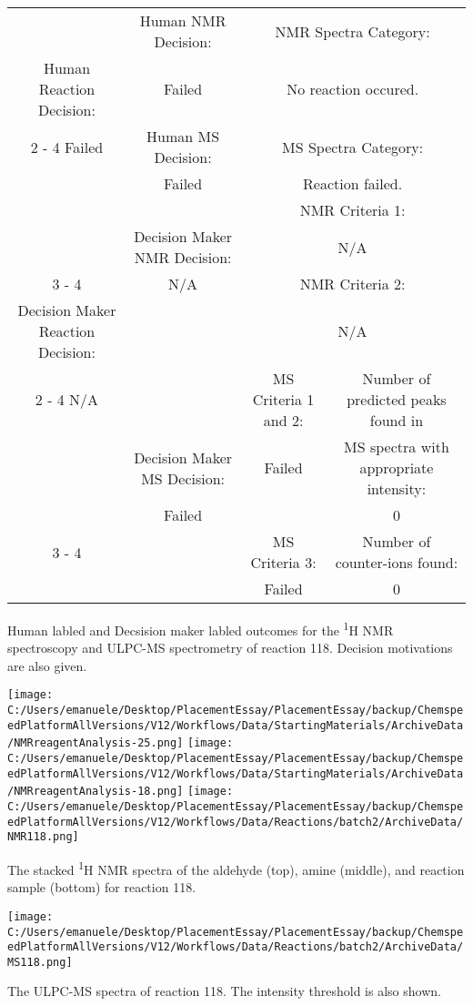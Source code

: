 \documentclass{article}%
\begin{document}
\begin{Decision Table}[H]%
\begin{tabular}{|c|c|c|c|}%
\hline%
&Human NMR Decision:&\multicolumn{2}{|c|}{NMR Spectra Category:}\\%
Human Reaction Decision:&Failed&\multicolumn{2}{|c|}{No reaction occured.}\\%
\cline{2%
-%
4}%
Failed&Human MS Decision:&\multicolumn{2}{|c|}{MS Spectra Category:}\\%
&Failed&\multicolumn{2}{|c|}{Reaction failed.}\\%
\hline%
&&\multicolumn{2}{|c|}{NMR Criteria 1:}\\%
&Decision Maker NMR Decision:&\multicolumn{2}{|c|}{N/A}\\%
\cline{3%
-%
4}%
&N/A&\multicolumn{2}{|c|}{NMR Criteria 2:}\\%
Decision Maker Reaction Decision:&&\multicolumn{2}{|c|}{N/A}\\%
\cline{2%
-%
4}%
N/A&&MS Criteria 1 and 2:&Number of predicted peaks found in\\%
&Decision Maker MS Decision:&Failed&MS spectra with appropriate intensity:\\%
&Failed&&0\\%
\cline{3%
-%
4}%
&&MS Criteria 3:&Number of counter{-}ions found:\\%
&&Failed&0\\%
\hline%
\end{tabular}%
\caption{Human labled and Decsision maker labled outcomes for the \textsuperscript{1}H NMR spectroscopy and ULPC-MS spectrometry of reaction 118. Decision motivations are also given.}%
\end{Decision Table}%
\begin{NMR Spectra}[H]%
\begin{center}%
\texttt{[image: C:/Users/emanuele/Desktop/PlacementEssay/PlacementEssay/backup/ChemspeedPlatformAllVersions/V12/Workflows/Data/StartingMaterials/ArchiveData/NMRreagentAnalysis-25.png]}\hfill%
\texttt{[image: C:/Users/emanuele/Desktop/PlacementEssay/PlacementEssay/backup/ChemspeedPlatformAllVersions/V12/Workflows/Data/StartingMaterials/ArchiveData/NMRreagentAnalysis-18.png]}\hfill%
\texttt{[image: C:/Users/emanuele/Desktop/PlacementEssay/PlacementEssay/backup/ChemspeedPlatformAllVersions/V12/Workflows/Data/Reactions/batch2/ArchiveData/NMR118.png]}\hfill%
\end{center}%
\caption{The stacked \textsuperscript{1}H NMR spectra of the aldehyde (top), amine (middle), and reaction sample (bottom) for reaction 118.}%
\end{NMR Spectra}%
\begin{MS Spectra}[H]%
\begin{center}%
\texttt{[image: C:/Users/emanuele/Desktop/PlacementEssay/PlacementEssay/backup/ChemspeedPlatformAllVersions/V12/Workflows/Data/Reactions/batch2/ArchiveData/MS118.png]}\hfill%
\end{center}%
\caption{The ULPC-MS spectra of reaction 118. The intensity threshold is also shown.}%
\end{MS Spectra}%
\end{document}
